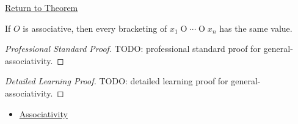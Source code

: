 \newpage
{}
\label{prf:general-associativity}

\begin{remark*}[Return]
\hyperref[thm:general-associativity]{Return to Theorem}
\end{remark*}

\begin{theorem*}
If $O$ is associative, then every bracketing of
$x_1\mathbin{O}\cdots\mathbin{O}x_n$ has the same value.
\end{theorem*}

\begin{proof}[Professional Standard Proof]
\LRAProofBodyStart
TODO: professional standard proof for general-associativity.
\end{proof}

\begin{proof}[Detailed Learning Proof]
\LRAProofBodyStart
TODO: detailed learning proof for general-associativity.
\end{proof}

\begin{remark*}
\end{remark*}

\begin{dependencies}
\begin{itemize}
  \item \hyperref[def:associativity]{Associativity}
\end{itemize}
\end{dependencies}

\clearpage
